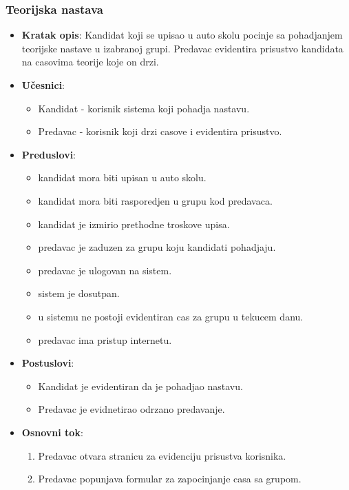 \subsubsection{Teorijska nastava}
\label{subsubsec:prijava za nastavu}
\begin{itemize}
  \item \textbf{Kratak opis}: Kandidat koji se upisao u auto skolu pocinje sa pohadjanjem teorijske nastave u izabranoj grupi. Predavac evidentira prisustvo kandidata na casovima teorije koje on drzi.
  \item \textbf{Učesnici}:
    \begin{itemize}
    \item  Kandidat - korisnik sistema koji pohadja nastavu.
    \item  Predavac - korisnik koji drzi casove i evidentira prisustvo.
    \end{itemize}
  \item \textbf{Preduslovi}:
    \begin{itemize}
    \item  kandidat mora biti upisan u auto skolu.
    \item  kandidat mora biti rasporedjen u grupu kod predavaca.
    \item  kandidat je izmirio  prethodne troskove upisa.
    \item  predavac je zaduzen za grupu koju kandidati pohadjaju.
    \item  predavac je ulogovan na sistem.
    \item  sistem je dosutpan.
    \item  u sistemu ne postoji evidentiran cas za grupu u tekucem danu.
    \item  predavac  ima pristup internetu.
    \end{itemize}
  \item \textbf{Postuslovi}:
      \begin{itemize}
      \item Kandidat je evidentiran da je pohadjao nastavu.
      \item Predavac je evidnetirao odrzano predavanje.
      \end{itemize}
  \item \textbf{Osnovni tok}:
      \begin{enumerate}
        \item Predavac otvara stranicu za evidenciju prisustva korisnika.
        \item Predavac popunjava formular za zapocinjanje casa sa grupom.

\end{enumerate}
\end{itemize}

